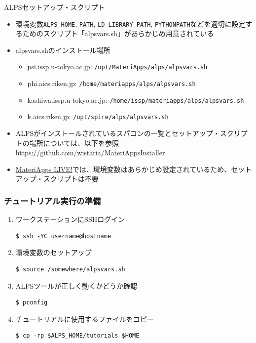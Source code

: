 \begin{frame}[t,fragile]{ALPSセットアップ・スクリプト}
  \begin{itemize}
  \item 環境変数{\tt ALPS\_HOME}, {\tt PATH}, {\tt LD\_LIBRARY\_PATH}, {\tt PYTHONPATH}などを適切に設定するためのスクリプト「{\color {red}alpsvars.sh}」があらかじめ用意されている
  \item alpsvars.shのインストール場所
    \begin{itemize}
    \item psi.issp.u-tokyo.ac.jp:
      {\footnotesize \tt /opt/MateriApps/alps/alpsvars.sh}
    \item phi.aics.riken.jp:
      {\footnotesize \tt /home/materiapps/alps/alpsvars.sh}
    \item kashiwa.issp.u-tokyo.ac.jp:
      {\footnotesize \tt /home/issp/materiapps/alps/alpsvars.sh}
    \item k.aics.riken.jp:
      {\footnotesize \tt /opt/spire/alps/alpsvars.sh}
    \end{itemize}
  \item {\color{red} ALPSがインストールされているスパコン}の一覧とセットアップ・スクリプトの場所については、以下を参照 {\footnotesize \url{https://github.com/wistaria/MateriAppsInstaller}}
  \item \href{http://cmsi.github.io/MateriAppsLive/}{MateriApps LIVE!}では、環境変数はあらかじめ設定されているため、セットアップ・スクリプトは不要
  \end{itemize}
\end{frame}

\begin{frame}[t,fragile]
  \frametitle{チュートリアル実行の準備}
  \begin{enumerate}
  \item ワークステーションにSSHログイン
\begin{lstlisting}
$ ssh -YC username@hostname
\end{lstlisting}
  \item 環境変数のセットアップ
\begin{lstlisting}
$ source /somewhere/alpsvars.sh
\end{lstlisting}
  \item ALPSツールが正しく動くかどうか確認
\begin{lstlisting}
$ pconfig
\end{lstlisting}
  \item チュートリアルに使用するファイルをコピー
\begin{lstlisting}
$ cp -rp $ALPS_HOME/tutorials $HOME
\end{lstlisting}
  \end{enumerate}
\end{frame}


